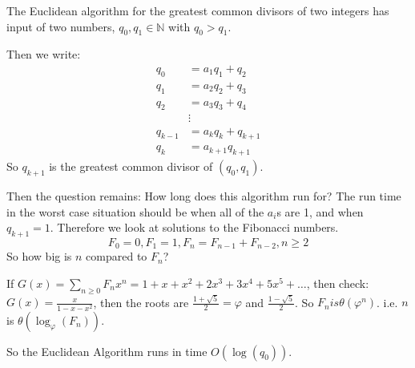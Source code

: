 \documentclass[12pt,letterpaper]{article}
\theoremstyle{definition}
\begin{document}
The Euclidean algorithm for the greatest common divisors of two integers has input of two numbers, $q_0, q_1 \in \mathbb{N}$ with $q_0 > q_1$. 

Then we write:
\begin{align*}
q_0 &= a_1q_1 + q_2\\
q_1 &= a_2q_2 + q_3\\
q_2 &= a_3q_3 + q_4\\
&\vdots\\
q_{k-1} &= a_kq_k + q_{k+1}\\
q_k &= a_{k+1}q_{k+1}
\end{align*}	
So $q_{k+1}$ is the greatest common divisor of $(q_0, q_1)$. 

Then the question remains: How long does this algorithm run for? The run time in the worst case situation should be when all of the $a_i$s are 1, and when $q_{k+1} = 1$. Therefore we look at solutions to the Fibonacci numbers. 
\[F_0 = 0, F_1 = 1, F_n = F_{n-1} + F_{n-2}, n \geq 2\]
So how big is $n$ compared to $F_n$?

If $G(x) = \sum_{n\geq 0} F_nx^n = 1 + x + x^2 + 2x^3 + 3x^4 + 5x^5 + \ldots$, then check: $G(x) = \frac{x}{1-x-x^2}$, then the roots are $\frac{1 + \sqrt{5}}{2} = \varphi$ and $\frac{1-\sqrt{5}}{2}$. So $F_n is \theta(\varphi^n)$. i.e. $n$ is $\theta(\log_\varphi(F_n))$. 

So the Euclidean Algorithm runs in time $O(\log(q_0))$. 
\end{document}
